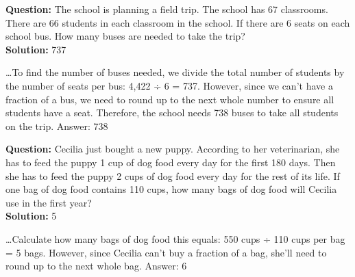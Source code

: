\begin{tcolorbox}[colback=gray!6, colframe=gray!50, arc=2mm, boxrule=0.5pt]
    \small
    \textbf{Question:} The school is planning a field trip. The school has 67 classrooms. There are 66 students in each classroom in the school. If there are 6 seats on each school bus. How many buses are needed to take the trip?\\
    \textbf{Solution:} 737
    
    \medskip
    \vspace{-0.1cm}
    \begin{tcolorbox}[
    title={Claude 3.5 Sonnet (June)},
    coltitle=black,
    colbacktitle=gray!25,
    colback=white, 
    colframe=gray!50,
    arc=2mm,
    boxrule=0.5pt]
    \ldots To find the number of buses needed, we divide the total number of students by the number of seats per bus:
4,422 ÷ 6 = 737. However, since we can't have a fraction of a bus, we need to round up to the next whole number to ensure all students have a seat. Therefore, the school needs 738 buses to take all students on the trip. Answer: 738
    \end{tcolorbox}
    \end{tcolorbox}

\begin{tcolorbox}[colback=gray!6, colframe=gray!50, arc=2mm, boxrule=0.5pt]
    \small
    \textbf{Question:} Cecilia just bought a new puppy. According to her veterinarian, she has to feed the puppy 1 cup of dog food every day for the first 180 days. Then she has to feed the puppy 2 cups of dog food every day for the rest of its life. If one bag of dog food contains 110 cups, how many bags of dog food will Cecilia use in the first year?\\
    \textbf{Solution:} 5
    
    \medskip
    \vspace{-0.1cm}
    \begin{tcolorbox}[
    title={Claude 3.5 Sonnet (June)},
    coltitle=black,
    colbacktitle=gray!25,
    colback=white, 
    colframe=gray!50,
    arc=2mm,
    boxrule=0.5pt]
    \ldots Calculate how many bags of dog food this equals:
550 cups ÷ 110 cups per bag = 5 bags. However, since Cecilia can't buy a fraction of a bag, she'll need to round up to the next whole bag. Answer: 6
    \end{tcolorbox}
    \end{tcolorbox}

\vspace{0.2cm}

